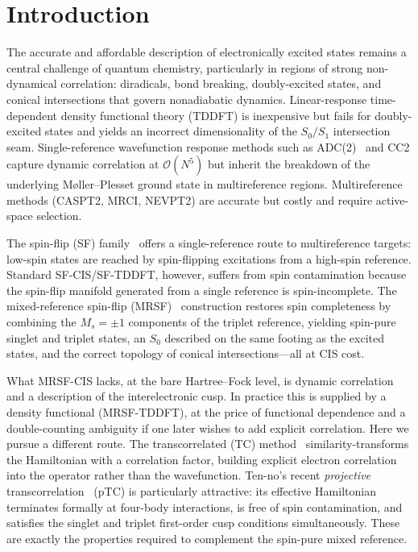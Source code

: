 \documentclass[aps,prb,reprint,superscriptaddress,floatfix]{revtex4-2}
\begin{document}
\maketitle

\section{Introduction}

The accurate and affordable description of electronically excited states remains
a central challenge of quantum chemistry, particularly in regions of strong
non-dynamical correlation: diradicals, bond breaking, doubly-excited states, and
conical intersections that govern nonadiabatic dynamics. Linear-response
time-dependent density functional theory (TDDFT) is inexpensive but fails for
doubly-excited states and yields an incorrect dimensionality of the $S_0/S_1$
intersection seam. Single-reference wavefunction response methods such as
ADC(2)~\cite{schirmer1982,dreuw2015} and CC2 capture dynamic correlation at
$\mathcal{O}(N^5)$ but inherit the breakdown of the underlying M{\o}ller--Plesset
ground state in multireference regions. Multireference methods (CASPT2, MRCI,
NEVPT2) are accurate but costly and require active-space selection.

The spin-flip (SF) family~\cite{krylov2001} offers a single-reference route to
multireference targets: low-spin states are reached by spin-flipping excitations
from a high-spin reference. Standard SF-CIS/SF-TDDFT, however, suffers from spin
contamination because the spin-flip manifold generated from a single reference is
spin-incomplete. The mixed-reference spin-flip
(MRSF)~\cite{lee2018,horbatenko2021} construction restores spin completeness by
combining the $M_s=\pm1$ components of the triplet reference, yielding spin-pure
singlet and triplet states, an $S_0$ described on the same footing as the excited
states, and the correct topology of conical intersections---all at CIS cost.

What MRSF-CIS lacks, at the bare Hartree--Fock level, is dynamic correlation and a
description of the interelectronic cusp. In practice this is supplied by a
density functional (MRSF-TDDFT), at the price of functional dependence and a
double-counting ambiguity if one later wishes to add explicit correlation. Here
we pursue a different route. The transcorrelated (TC)
method~\cite{boys1969,tenno2000} similarity-transforms the Hamiltonian with a
correlation factor, building explicit electron correlation into the operator
rather than the wavefunction. Ten-no's recent \emph{projective}
transcorrelation~\cite{tenno2023} (pTC) is particularly attractive: its effective
Hamiltonian terminates formally at four-body interactions, is free of spin
contamination, and satisfies the singlet and triplet first-order cusp conditions
simultaneously. These are exactly the properties required to complement the
spin-pure mixed reference.
\end{document}
